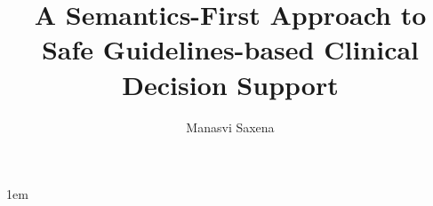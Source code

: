 \documentclass[edeposit,tocnosub,noragright,centerchapter,fullpagesingle,12pt]{uiuc_csthesis21}
\title{A Semantics-First Approach to Safe Guidelines-based Clinical Decision Support}
\author{Manasvi Saxena}
\theoremstyle{definition}
\begin{document}
\maketitle
\parindent 1em%

\frontmatter



%
\end{document}
